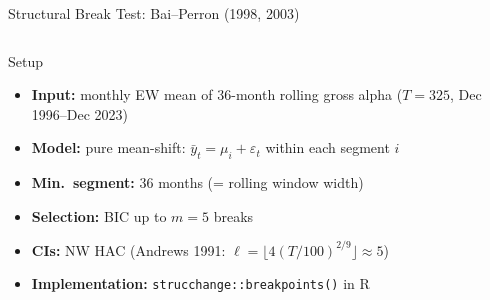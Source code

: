 \documentclass[aspectratio=169,10pt]{beamer}
\begin{document}
\begin{frame}{Structural Break Test: Bai--Perron (1998, 2003)}
\begin{columns}[T]
\begin{block}{Setup}
{\footnotesize
\begin{itemize}
  \item \textbf{Input:} monthly EW mean of 36-month rolling gross alpha ($T=325$, Dec 1996–Dec 2023)
  \item \textbf{Model:} pure mean-shift: $\bar{y}_t = \mu_i + \varepsilon_t$ within each segment $i$
  \item \textbf{Min.\ segment:} 36 months (= rolling window width)
  \item \textbf{Selection:} BIC up to $m=5$ breaks
  \item \textbf{CIs:} NW HAC (Andrews 1991: $\ell = \lfloor 4(T/100)^{2/9}\rfloor \approx 5$)
  \item \textbf{Implementation:} \texttt{strucchange::breakpoints()} in R
\end{itemize}}
\end{block}


\end{columns}
\end{frame}
\end{document}
